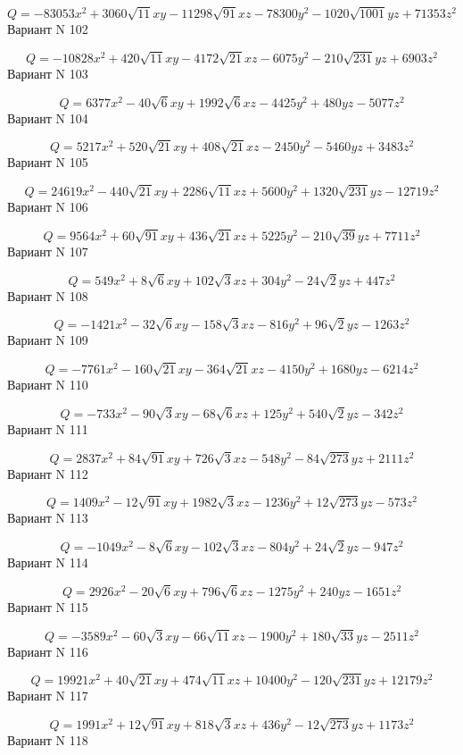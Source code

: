 \documentclass[11pt]{report}
\begin{document}
$$Q = - 83053 x^{2} + 3060 \sqrt{11} x y - 11298 \sqrt{91} x z - 78300 y^{2} - 1020 \sqrt{1001} y z + 71353 z^{2}$$Вариант N 102

$$Q = - 10828 x^{2} + 420 \sqrt{11} x y - 4172 \sqrt{21} x z - 6075 y^{2} - 210 \sqrt{231} y z + 6903 z^{2}$$Вариант N 103

$$Q = 6377 x^{2} - 40 \sqrt{6} x y + 1992 \sqrt{6} x z - 4425 y^{2} + 480 y z - 5077 z^{2}$$Вариант N 104

$$Q = 5217 x^{2} + 520 \sqrt{21} x y + 408 \sqrt{21} x z - 2450 y^{2} - 5460 y z + 3483 z^{2}$$Вариант N 105

$$Q = 24619 x^{2} - 440 \sqrt{21} x y + 2286 \sqrt{11} x z + 5600 y^{2} + 1320 \sqrt{231} y z - 12719 z^{2}$$Вариант N 106

$$Q = 9564 x^{2} + 60 \sqrt{91} x y + 436 \sqrt{21} x z + 5225 y^{2} - 210 \sqrt{39} y z + 7711 z^{2}$$Вариант N 107

$$Q = 549 x^{2} + 8 \sqrt{6} x y + 102 \sqrt{3} x z + 304 y^{2} - 24 \sqrt{2} y z + 447 z^{2}$$Вариант N 108

$$Q = - 1421 x^{2} - 32 \sqrt{6} x y - 158 \sqrt{3} x z - 816 y^{2} + 96 \sqrt{2} y z - 1263 z^{2}$$Вариант N 109

$$Q = - 7761 x^{2} - 160 \sqrt{21} x y - 364 \sqrt{21} x z - 4150 y^{2} + 1680 y z - 6214 z^{2}$$Вариант N 110

$$Q = - 733 x^{2} - 90 \sqrt{3} x y - 68 \sqrt{6} x z + 125 y^{2} + 540 \sqrt{2} y z - 342 z^{2}$$Вариант N 111

$$Q = 2837 x^{2} + 84 \sqrt{91} x y + 726 \sqrt{3} x z - 548 y^{2} - 84 \sqrt{273} y z + 2111 z^{2}$$Вариант N 112

$$Q = 1409 x^{2} - 12 \sqrt{91} x y + 1982 \sqrt{3} x z - 1236 y^{2} + 12 \sqrt{273} y z - 573 z^{2}$$Вариант N 113

$$Q = - 1049 x^{2} - 8 \sqrt{6} x y - 102 \sqrt{3} x z - 804 y^{2} + 24 \sqrt{2} y z - 947 z^{2}$$Вариант N 114

$$Q = 2926 x^{2} - 20 \sqrt{6} x y + 796 \sqrt{6} x z - 1275 y^{2} + 240 y z - 1651 z^{2}$$Вариант N 115

$$Q = - 3589 x^{2} - 60 \sqrt{3} x y - 66 \sqrt{11} x z - 1900 y^{2} + 180 \sqrt{33} y z - 2511 z^{2}$$Вариант N 116

$$Q = 19921 x^{2} + 40 \sqrt{21} x y + 474 \sqrt{11} x z + 10400 y^{2} - 120 \sqrt{231} y z + 12179 z^{2}$$Вариант N 117

$$Q = 1991 x^{2} + 12 \sqrt{91} x y + 818 \sqrt{3} x z + 436 y^{2} - 12 \sqrt{273} y z + 1173 z^{2}$$Вариант N 118
\end{document}

